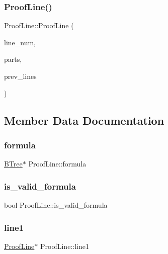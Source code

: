 \subsubsection{\texorpdfstring{Proof\+Line()}{ProofLine()}}
{\footnotesize\ttfamily Proof\+Line\+::\+Proof\+Line (\begin{DoxyParamCaption}\item[{int}]{line\+\_\+num,  }\item[{std\+::vector$<$ std\+::string $>$}]{parts,  }\item[{std\+::vector$<$ \hyperlink{classProofLine}{Proof\+Line} $\ast$$>$}]{prev\+\_\+lines }\end{DoxyParamCaption})}



\subsection{Member Data Documentation}
\mbox{\label{classProofLine_ac9dee0241ef4f6371135098fd5b1a66d}} 
\subsubsection{\texorpdfstring{formula}{formula}}
{\footnotesize\ttfamily \hyperlink{classBTree}{B\+Tree}$\ast$ Proof\+Line\+::formula}

\mbox{\label{classProofLine_a8531e674967263c2e6ba67d8bf12a336}} 
\subsubsection{\texorpdfstring{is\+\_\+valid\+\_\+formula}{is\_valid\_formula}}
{\footnotesize\ttfamily bool Proof\+Line\+::is\+\_\+valid\+\_\+formula}

\mbox{\label{classProofLine_a7dbdcf0ea65aed377c5ac03303b474a6}} 
\subsubsection{\texorpdfstring{line1}{line1}}
{\footnotesize\ttfamily \hyperlink{classProofLine}{Proof\+Line}$\ast$ Proof\+Line\+::line1}

